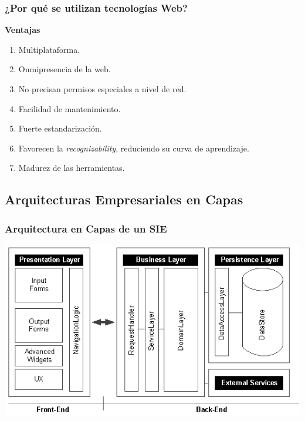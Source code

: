 \documentclass[a4paper,slidestop,xcolor=pst,dvips,blue]{beamer}
\begin{document}
\begin{frame}[c]
	\frametitle{¿Por qué se utilizan tecnologías Web?}
    \centering \textbf{Ventajas} \\
    \begin{enumerate}
        \item<2-> Multiplataforma.
        \item<3-> Onmipresencia de la web.
        \item<4-> No precisan permisos especiales a nivel de red.
        \item<5-> Facilidad de mantenimiento.
        \item<6-> Fuerte estandarización.
        \item<7-> Favorecen la \emph{recognizability}, reduciendo su curva de aprendizaje.
        \item<8-> Madurez de las herramientas.
    \end{enumerate}
\end{frame}

\subsection{Arquitecturas Empresariales en Capas}

\begin{frame}[c]
	\frametitle{Arquitectura en Capas de un SIE}
	\begin{center}
        \includegraphics[width=\linewidth,keepaspectratio=true]{images/enterpriseLayers/enterpriseLayers.eps}
	\end{center}
\end{frame}
\end{document}
